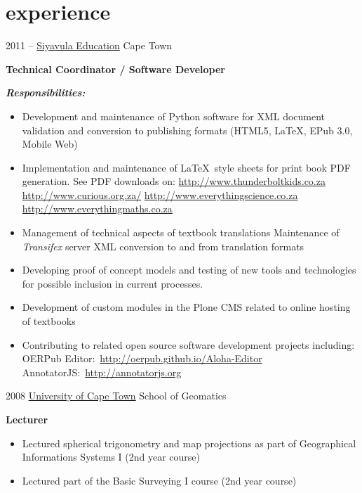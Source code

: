 \documentclass[]{friggeri-cv} %
\begin{document}
\section{experience}
\begin{entrylist}
\entry
{2011 -- }
{\href{http://www.siyavula.com}{Siyavula Education}}
{Cape Town}
{%
\textbf{Technical Coordinator / Software Developer}

\textbf{\textit{Responsibilities:}}
\begin{itemize}
\setlength{\itemsep}{5pt}
\item Development and maintenance of Python software for XML document validation and conversion to publishing formats (HTML5, \LaTeX, EPub 3.0, Mobile Web)
\item Implementation and maintenance of \LaTeX~style sheets for print book PDF generation. See PDF downloads on:
    \subitem \url{http://www.thunderboltkids.co.za}
    \subitem \url{http://www.curious.org.za/}
    \subitem \url{http://www.everythingscience.co.za}
    \subitem \url{http://www.everythingmaths.co.za}

\item Management of technical aspects of textbook translations
    \subitem Maintenance of \emph{Transifex} server
    \subitem XML conversion to and from translation formats

\item Developing proof of concept models and testing of new tools and technologies for possible inclusion in current processes.

\item Development of custom modules in the Plone CMS related to online hosting of textbooks

\item Contributing to related open source software development projects including:
    \subitem OERPub Editor:~\url{http://oerpub.github.io/Aloha-Editor}
    \subitem AnnotatorJS:~\url{http://annotatorjs.org}
\end{itemize}
}
\end{entrylist}
\begin{entrylist}
%
\entry
{2008}
{\href{http://www.uct.ac.za}{University of Cape Town}}
{School of Geomatics}
{%
\textbf{Lecturer}
\begin{itemize}
\setlength{\itemsep}{5pt}
    \item Lectured spherical trigonometry and map projections as part of Geographical Informations Systems I (2nd year course)
    \item Lectured part of the Basic Surveying I course (2nd year course)
\end{itemize}
}
\end{entrylist}
\end{document}
